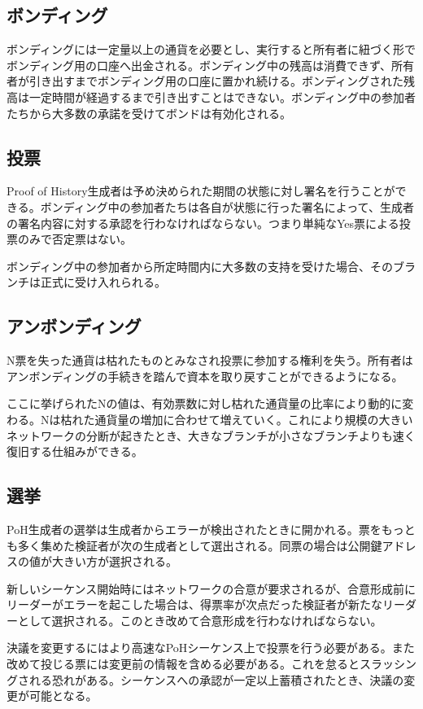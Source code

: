 \documentclass[12pt]{ltjsarticle}
\begin{document}
\subsection{ボンディング}
ボンディングには一定量以上の通貨を必要とし、実行すると所有者に紐づく形でボンディング用の口座へ出金される。ボンディング中の残高は消費できず、所有者が引き出すまでボンディング用の口座に置かれ続ける。ボンディングされた残高は一定時間が経過するまで引き出すことはできない。ボンディング中の参加者たちから大多数の承諾を受けてボンドは有効化される。

\subsection{投票}
Proof of History生成者は予め決められた期間の状態に対し署名を行うことができる。ボンディング中の参加者たちは各自が状態に行った署名によって、生成者の署名内容に対する承認を行わなければならない。つまり単純なYes票による投票のみで否定票はない。

ボンディング中の参加者から所定時間内に大多数の支持を受けた場合、そのブランチは正式に受け入れられる。

\subsection{アンボンディング}

N票を失った通貨は枯れたものとみなされ投票に参加する権利を失う。所有者はアンボンディングの手続きを踏んで資本を取り戻すことができるようになる。

ここに挙げられたNの値は、有効票数に対し枯れた通貨量の比率により動的に変わる。Nは枯れた通貨量の増加に合わせて増えていく。これにより規模の大きいネットワークの分断が起きたとき、大きなブランチが小さなブランチよりも速く復旧する仕組みができる。

\subsection{選挙}\label{subsec:elections}
PoH生成者の選挙は生成者からエラーが検出されたときに開かれる。票をもっとも多く集めた検証者が次の生成者として選出される。同票の場合は公開鍵アドレスの値が大きい方が選択される。

新しいシーケンス開始時にはネットワークの合意が要求されるが、合意形成前にリーダーがエラーを起こした場合は、得票率が次点だった検証者が新たなリーダーとして選択される。このとき改めて合意形成を行わなければならない。

決議を変更するにはより高速なPoHシーケンス上で投票を行う必要がある。また改めて投じる票には変更前の情報を含める必要がある。これを怠るとスラッシングされる恐れがある。シーケンスへの承認が一定以上蓄積されたとき、決議の変更が可能となる。
\end{document}
